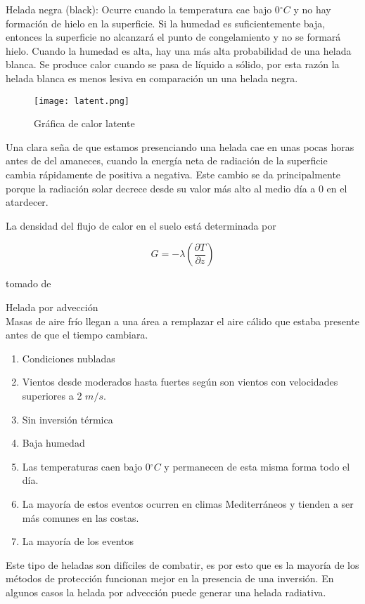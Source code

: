 \documentclass[11pt]{article}
\def\celc{$^{\circ}C$ }%
\begin{document}
Helada negra (black): Ocurre cuando la temperatura cae bajo 0\celc y no hay formación de hielo en la superficie. Si la humedad es suficientemente baja, entonces la superficie no alcanzará el punto de congelamiento y no se formará hielo. Cuando la humedad es alta, hay una más alta probabilidad de una helada blanca. Se produce calor cuando se pasa de líquido a sólido, por esta razón la helada blanca es menos lesiva en comparación un una helada negra.

\begin{figure}[H]
	\begin{center}
	\texttt{[image: latent.png]}
		\caption{Gráfica de calor latente}
		\label{subfig:cal_lat}	
	\end{center}

\end{figure}

Una clara seña de que estamos presenciando una helada cae en unas pocas horas antes de del amaneces, cuando la energía neta de radiación de la superficie cambia rápidamente de positiva a negativa. Este cambio se da principalmente porque la radiación solar decrece desde su valor más alto al medio día a 0 en el atardecer.

La densidad del flujo de calor en el suelo está determinada por 

\begin{equation}\label{eq:frost_index}
    G = -\lambda(\frac{\partial T}{\partial z})
\end{equation}

tomado de \citep{sauer2002soil}

Helada por advección\\
Masas de aire frío llegan a una área a remplazar el aire cálido que estaba presente antes de que el tiempo cambiara.

\begin{enumerate}
\item Condiciones nubladas
\item Vientos desde moderados hasta fuertes según \citet{prabha2008evaluation} son vientos con velocidades superiores a 2 $m/s$.
\item Sin inversión térmica
\item Baja humedad
\item Las temperaturas caen bajo 0\celc y permanecen de esta misma forma todo el día.
\item La mayoría de estos eventos ocurren en climas Mediterráneos y tienden a ser más comunes en las costas.
\item La mayoría de los eventos
\end{enumerate}
Este tipo de heladas son difíciles de combatir, es por esto que es la mayoría de los métodos de protección funcionan mejor en la presencia de una inversión. En algunos casos la helada por advección puede generar una helada radiativa.\\
\end{document}
